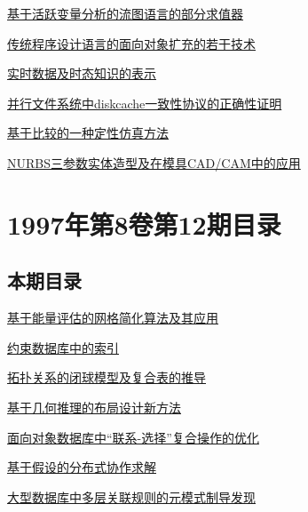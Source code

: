 \documentclass[a4paper]{article}
\begin{document}
\href{http://www.jos.org.cn/ch/reader/download_pdf.aspx?file_no=19970105&year_id=1997&quarter_id=1&falg=1}{基于活跃变量分析的流图语言的部分求值器}

\href{http://www.jos.org.cn/ch/reader/download_pdf.aspx?file_no=19970106&year_id=1997&quarter_id=1&falg=1}{传统程序设计语言的面向对象扩充的若干技术}

\href{http://www.jos.org.cn/ch/reader/download_pdf.aspx?file_no=19970107&year_id=1997&quarter_id=1&falg=1}{实时数据及时态知识的表示}

\href{http://www.jos.org.cn/ch/reader/download_pdf.aspx?file_no=19970108&year_id=1997&quarter_id=1&falg=1}{并行文件系统中diskcache一致性协议的正确性证明}

\href{http://www.jos.org.cn/ch/reader/download_pdf.aspx?file_no=19970109&year_id=1997&quarter_id=1&falg=1}{基于比较的一种定性仿真方法}

\href{http://www.jos.org.cn/ch/reader/download_pdf.aspx?file_no=19970110&year_id=1997&quarter_id=1&falg=1}{NURBS三参数实体造型及在模具CAD/CAM中的应用}


\section{\textbf{1997年第8卷第12期目录}}
\subsection{本期目录}
\href{http://www.jos.org.cn/ch/reader/download_pdf.aspx?file_no=19971201&year_id=1997&quarter_id=12&falg=1}{基于能量评估的网格简化算法及其应用}

\href{http://www.jos.org.cn/ch/reader/download_pdf.aspx?file_no=19971202&year_id=1997&quarter_id=12&falg=1}{约束数据库中的索引}

\href{http://www.jos.org.cn/ch/reader/download_pdf.aspx?file_no=19971203&year_id=1997&quarter_id=12&falg=1}{拓扑关系的闭球模型及复合表的推导}

\href{http://www.jos.org.cn/ch/reader/download_pdf.aspx?file_no=19971204&year_id=1997&quarter_id=12&falg=1}{基于几何推理的布局设计新方法}

\href{http://www.jos.org.cn/ch/reader/download_pdf.aspx?file_no=19971205&year_id=1997&quarter_id=12&falg=1}{面向对象数据库中“联系-选择”复合操作的优化}

\href{http://www.jos.org.cn/ch/reader/download_pdf.aspx?file_no=19971206&year_id=1997&quarter_id=12&falg=1}{基于假设的分布式协作求解}

\href{http://www.jos.org.cn/ch/reader/download_pdf.aspx?file_no=19971207&year_id=1997&quarter_id=12&falg=1}{大型数据库中多层关联规则的元模式制导发现}
\end{document}
